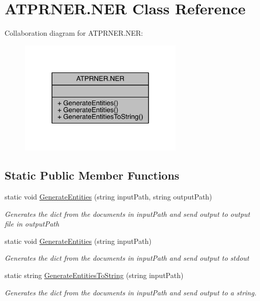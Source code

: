 \hypertarget{class_a_t_p_r_n_e_r_1_1_n_e_r}{}\section{A\+T\+P\+R\+N\+E\+R.\+N\+ER Class Reference}
\label{class_a_t_p_r_n_e_r_1_1_n_e_r}


Collaboration diagram for A\+T\+P\+R\+N\+E\+R.\+N\+ER\+:
\nopagebreak
\begin{figure}[H]
\begin{center}
\leavevmode
\includegraphics[width=222pt]{d2/d33/class_a_t_p_r_n_e_r_1_1_n_e_r__coll__graph}
\end{center}
\end{figure}
\subsection*{Static Public Member Functions}
\begin{DoxyCompactItemize}
\item 
static void \hyperlink{class_a_t_p_r_n_e_r_1_1_n_e_r_ac52e8765543f6342e2fb0fd4283f10d7}{Generate\+Entities} (string input\+Path, string output\+Path)
\begin{DoxyCompactList}\small\item\em Generates the dict from the documents in input\+Path and send output to output file in output\+Path \end{DoxyCompactList}\item 
static void \hyperlink{class_a_t_p_r_n_e_r_1_1_n_e_r_afbf080a32a868531adb8c7f4ec5f8035}{Generate\+Entities} (string input\+Path)
\begin{DoxyCompactList}\small\item\em Generates the dict from the documents in input\+Path and send output to stdout \end{DoxyCompactList}\item 
static string \hyperlink{class_a_t_p_r_n_e_r_1_1_n_e_r_a8480137d05620d726021a2f4ae818869}{Generate\+Entities\+To\+String} (string input\+Path)
\begin{DoxyCompactList}\small\item\em Generates the dict from the documents in input\+Path and send output to a string. \end{DoxyCompactList}\end{DoxyCompactItemize}


